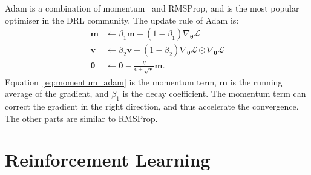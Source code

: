 Adam is a combination of momentum~\cite{qian1999momentum} and RMSProp, and is the most popular optimiser in the DRL community. The update rule of Adam is:
\begin{align}
    \mathbf{m} &\leftarrow \beta_{1} \mathbf{m} + (1 - \beta_{1})\nabla_{\bm{\theta}}\mathcal{L} \label{eq:momentum_adam}\\
    \mathbf{v} &\leftarrow \beta_{2} \mathbf{v} + (1 - \beta_{2})\nabla_{\bm{\theta}}\mathcal{L}\odot\nabla_{\bm{\theta}}\mathcal{L} \label{eq:squared_grad_adam}\\
     \bm{\theta} &\leftarrow \bm{\theta} - \frac{\eta}{\epsilon+\sqrt{\mathbf{v}}}\mathbf{m} \label{eq:adam_update}.
\end{align}
Equation~\eqref{eq:momentum_adam} is the momentum term, $\mathbf{m}$ is the running average of the gradient, and $\beta_{1}$ is the decay coefficient. The momentum term can correct the gradient in the right direction, and thus accelerate the convergence. The other parts are similar to RMSProp.

\section{Reinforcement Learning}
\label{ch3:rl}
